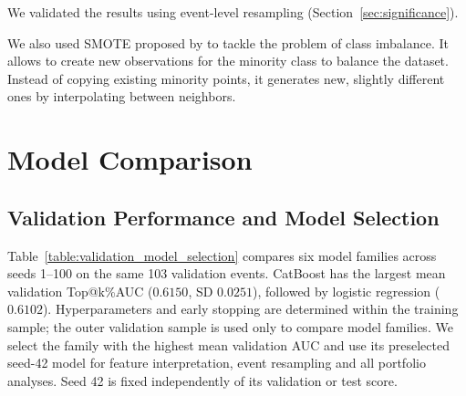 \documentclass{ieeeaccess}
\begin{document}
We validated the results using event-level resampling (Section~\ref{sec:significance}).

We also used SMOTE proposed by \cite{chawla2002smote} to tackle the problem of class imbalance. It allows to create new observations for the minority class to balance the dataset. Instead of copying existing minority points, it generates new, slightly different ones by interpolating between neighbors.


\FloatBarrier %
\section{Model Comparison}
\label{section:results}

\subsection{Validation Performance and Model Selection}
Table~\ref{table:validation_model_selection} compares six model families across seeds 1--100 on the same 103 validation events. CatBoost has the largest mean validation Top@k\%AUC ($0.6150$, SD $0.0251$), followed by logistic regression ($0.6102$). Hyperparameters and early stopping are determined within the training sample; the outer validation sample is used only to compare model families. We select the family with the highest mean validation AUC and use its preselected seed-42 model for feature interpretation, event resampling and all portfolio analyses. Seed 42 is fixed independently of its validation or test score.

\begin{table}[!tbp]
    \centering
    \small
    \setlength{\tabcolsep}{5pt}
    \renewcommand{\arraystretch}{1.15}
    \caption{Validation Top@k\%AUC across 100 seeds per model. Quantiles and standard deviations describe seed variation on the same 103 events. Model selection uses the highest mean AUC.}
    \label{table:validation_model_selection}
\end{table}
\end{document}
